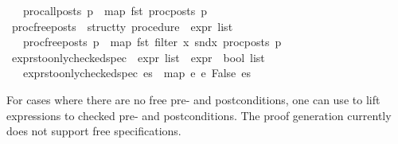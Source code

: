 \begin{isabellebody}
\ \ \ {\isachardoublequoteopen}proc{\isacharunderscore}{\kern0pt}all{\isacharunderscore}{\kern0pt}posts\ p\ {\isacharequal}{\kern0pt}\ map\ fst\ {\isacharparenleft}{\kern0pt}proc{\isacharunderscore}{\kern0pt}posts\ p{\isacharparenright}{\kern0pt}{\isachardoublequoteclose}\isanewline
\isanewline
{}\isamarkupfalse%
\ proc{\isacharunderscore}{\kern0pt}free{\isacharunderscore}{\kern0pt}posts\ {\isacharcolon}{\kern0pt}{\isacharcolon}{\kern0pt}\ {\isachardoublequoteopen}{\isacharprime}{\kern0pt}struct{\isacharunderscore}{\kern0pt}ty\ procedure\ {\isasymRightarrow}\ expr\ list{\isachardoublequoteclose}\isanewline
\ \ \ {\isachardoublequoteopen}proc{\isacharunderscore}{\kern0pt}free{\isacharunderscore}{\kern0pt}posts\ p\ {\isacharequal}{\kern0pt}\ map\ fst\ {\isacharparenleft}{\kern0pt}filter\ {\isacharparenleft}{\kern0pt}{\isasymlambda}x{\isachardot}{\kern0pt}\ snd{\isacharparenleft}{\kern0pt}x{\isacharparenright}{\kern0pt}{\isacharparenright}{\kern0pt}\ {\isacharparenleft}{\kern0pt}proc{\isacharunderscore}{\kern0pt}posts\ p{\isacharparenright}{\kern0pt}{\isacharparenright}{\kern0pt}{\isachardoublequoteclose}\isanewline
\isanewline
{}\isamarkupfalse%
\ exprs{\isacharunderscore}{\kern0pt}to{\isacharunderscore}{\kern0pt}only{\isacharunderscore}{\kern0pt}checked{\isacharunderscore}{\kern0pt}spec\ {\isacharcolon}{\kern0pt}{\isacharcolon}{\kern0pt}\ {\isachardoublequoteopen}expr\ list\ {\isasymRightarrow}\ {\isacharparenleft}{\kern0pt}expr\ {\isasymtimes}\ bool{\isacharparenright}{\kern0pt}\ list{\isachardoublequoteclose}\isanewline
\ \ \ {\isachardoublequoteopen}exprs{\isacharunderscore}{\kern0pt}to{\isacharunderscore}{\kern0pt}only{\isacharunderscore}{\kern0pt}checked{\isacharunderscore}{\kern0pt}spec\ es\ {\isacharequal}{\kern0pt}\ map\ {\isacharparenleft}{\kern0pt}{\isasymlambda}e{\isachardot}{\kern0pt}\ {\isacharparenleft}{\kern0pt}e{\isacharcomma}{\kern0pt}\ False{\isacharparenright}{\kern0pt}{\isacharparenright}{\kern0pt}\ es{\isachardoublequoteclose}%
\begin{isamarkuptext}%
For cases where there are no free pre- and postconditions, one can use
  to lift expressions to checked pre- and postconditions.
The proof generation currently does not support free specifications.%
\end{isamarkuptext}\isamarkuptrue%
\isamarkupfalse%

\end{isabellebody}
